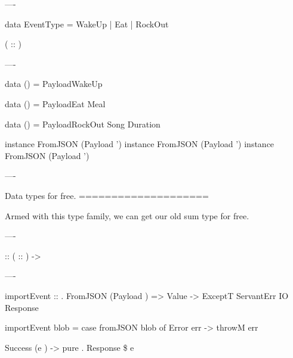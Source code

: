 ----

\begin{hs}

  data EventType = WakeUp | Eat | RockOut
\end{hs}

\begin{custom}
    ( :: )
\end{custom}

----

\begin{raw}
  data  () =
    PayloadWakeUp

  data  () =
    PayloadEat Meal

  data  () =
    PayloadRockOut Song Duration

  instance FromJSON (Payload ')
  instance FromJSON (Payload ')
  instance FromJSON (Payload ')
\end{raw}

----

Data types for free.
====================

Armed with this type family, we can get our old sum type for free.

----

\begin{custom}

    
     ::  ( :: ) -> 
\end{custom}

----

\begin{raw}

  importEvent :: 
               . FromJSON (Payload )
              => Value
              -> ExceptT ServantErr IO Response

  importEvent blob =
    case fromJSON blob of
      Error err ->
        throwM err

      Success (e ) ->
        pure . Response \$  e
\end{raw}


